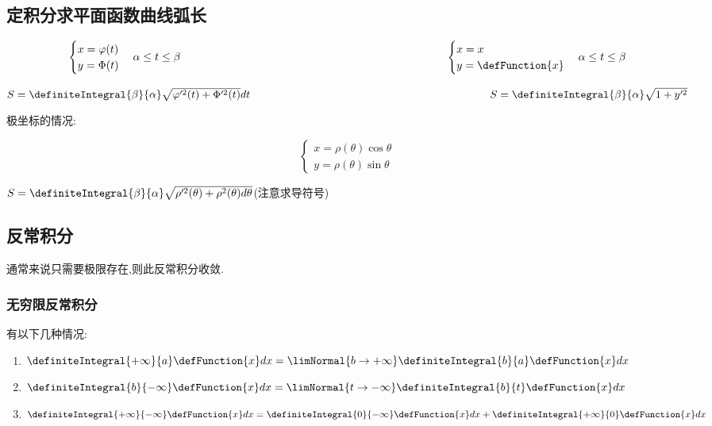 {{{{}%
}%

\subsection{定积分求平面函数曲线弧长}{

  $$
    \begin{cases}
      x = \varphi(t) \\
      y = \Phi(t)
    \end{cases}
    \alpha \leq t \leq \beta
    \qquad\qquad\qquad\qquad\qquad\qquad\qquad\qquad\qquad\qquad\qquad\qquad
    \begin{cases}
      x = x \\
      y = \defFunction{x}
    \end{cases}
    \alpha \leq t \leq \beta
  $$

  $S = \definiteIntegral{\beta}{\alpha}\sqrt{\varphi^{\prime 2}(t) + \Phi^{\prime 2}(t)}dt\qquad\qquad\qquad\qquad\qquad\qquad\qquad\qquad\qquad\qquad\qquad S = \definiteIntegral{\beta}{\alpha}\sqrt{1 + y^{\prime 2}}$

  极坐标的情况:

  $$
    \begin{cases}
      x = \rho(\theta)\cos\theta \\
      y = \rho(\theta)\sin\theta
    \end{cases}
  $$

  $S = \definiteIntegral{\beta}{\alpha}\sqrt{\rho^{\prime 2}(\theta) + \rho^2(\theta)d\theta}$\qquad(注意求导符号)
}%

\subsection{反常积分}{
通常来说只需要极限存在,则此反常积分收敛.

\subsubsection{无穷限反常积分}{

  有以下几种情况:

  \begin{enumerate}
    \item $\definiteIntegral{+\infty}{a}\defFunction{x}dx = \limNormal{b \to +\infty}\definiteIntegral{b}{a}\defFunction{x}dx$
    \item $\definiteIntegral{b}{-\infty}\defFunction{x}dx = \limNormal{t \to -\infty}\definiteIntegral{b}{t}\defFunction{x}dx$
    \item $\definiteIntegral{+\infty}{-\infty}\defFunction{x}dx = \definiteIntegral{0}{-\infty}\defFunction{x}dx + \definiteIntegral{+\infty}{0}\defFunction{x}dx$
  \end{enumerate}
}%


}}}
